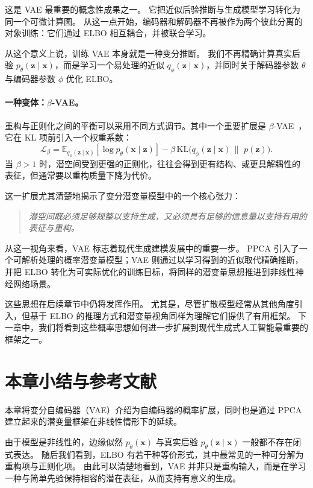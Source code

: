 这是 VAE 最重要的概念性成果之一。
它把近似后验推断与生成模型学习转化为同一个可微计算图。
从这一点开始，编码器和解码器不再被作为两个彼此分离的对象训练：它们通过 ELBO 相互耦合，并被联合学习。

从这个意义上说，训练 VAE 本身就是一种变分推断。
我们不再精确计算真实后验 $p_{\theta}(\mathbf{z}\mid\mathbf{x})$，而是学习一个易处理的近似
$q_{\phi}(\mathbf{z}\mid\mathbf{x})$，并同时关于解码器参数 $\theta$ 与编码器参数 $\phi$ 优化 ELBO。

\paragraph{一种变体：$\beta$-VAE。}

重构与正则化之间的平衡可以采用不同方式调节。其中一个重要扩展是
$\beta$-VAE~\cite{higgins2017beta}，它在 KL 项前引入一个权重系数：
\[
\mathcal{L}_{\beta}
=
\mathbb{E}_{q_{\phi}(\mathbf{z}\mid \mathbf{x})}
\!\left[
\log p_{\theta}(\mathbf{x}\mid \mathbf{z})
\right]
-
\beta\,
\mathrm{KL}\!\bigl(
q_{\phi}(\mathbf{z}\mid \mathbf{x})
\,\|\,\,
p(\mathbf{z})
\bigr).
\]
当 $\beta>1$ 时，潜空间受到更强的正则化，往往会得到更有结构、或更具解耦性的表征，但通常要以重构质量下降为代价。

这一扩展尤其清楚地揭示了变分潜变量模型中的一个核心张力：
\begin{quote}
\emph{潜空间既必须足够规整以支持生成，又必须具有足够的信息量以支持有用的表征与重构。}
\end{quote}

从这一视角来看，VAE 标志着现代生成建模发展中的重要一步。
PPCA 引入了一个可解析处理的概率潜变量模型；VAE 则通过以学习得到的近似取代精确推断，并把 ELBO 转化为可实际优化的训练目标，将同样的潜变量思想推进到非线性神经网络场景。

这些思想在后续章节中仍将发挥作用。
尤其是，尽管扩散模型经常从其他角度引入，但基于 ELBO 的推理方式和潜变量视角同样为理解它们提供了有用框架。
下一章中，我们将看到这些概率思想如何进一步扩展到现代生成式人工智能最重要的框架之一。

\section*{本章小结与参考文献}

本章将变分自编码器（VAE）介绍为自编码器的概率扩展，同时也是通过 PPCA 建立起来的潜变量框架在非线性情形下的延续。

由于模型是非线性的，边缘似然
$p_{\theta}(\mathbf{x})$ 与真实后验
$p_{\theta}(\mathbf{z}\mid\mathbf{x})$ 一般都不存在闭式表达。
随后我们看到，ELBO 有若干种等价形式，其中最常见的一种可分解为重构项与正则化项。
由此可以清楚地看到，VAE 并非只是重构输入，而是在学习一种与简单先验保持相容的潜在表征，从而支持有意义的生成。

